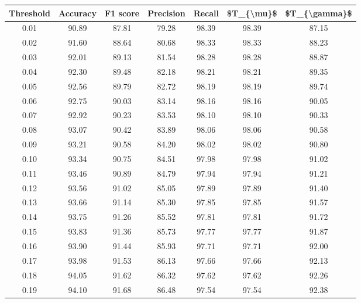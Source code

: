 \begin{tabular}{|c|c|c|c|c|c|c|}
\hline
 Threshold &  Accuracy &  F1 score &  Precision &  Recall &  \$T\_\{\textbackslash mu\}\$ &  \$T\_\{\textbackslash gamma\}\$ \\
\hline
      0.01 &     90.89 &     87.81 &      79.28 &   98.39 &      98.39 &         87.15 \\
      0.02 &     91.60 &     88.64 &      80.68 &   98.33 &      98.33 &         88.23 \\
      0.03 &     92.01 &     89.13 &      81.54 &   98.28 &      98.28 &         88.87 \\
      0.04 &     92.30 &     89.48 &      82.18 &   98.21 &      98.21 &         89.35 \\
      0.05 &     92.56 &     89.79 &      82.72 &   98.19 &      98.19 &         89.74 \\
      0.06 &     92.75 &     90.03 &      83.14 &   98.16 &      98.16 &         90.05 \\
      0.07 &     92.92 &     90.23 &      83.53 &   98.10 &      98.10 &         90.33 \\
      0.08 &     93.07 &     90.42 &      83.89 &   98.06 &      98.06 &         90.58 \\
      0.09 &     93.21 &     90.58 &      84.20 &   98.02 &      98.02 &         90.80 \\
      0.10 &     93.34 &     90.75 &      84.51 &   97.98 &      97.98 &         91.02 \\
      0.11 &     93.46 &     90.89 &      84.79 &   97.94 &      97.94 &         91.21 \\
      0.12 &     93.56 &     91.02 &      85.05 &   97.89 &      97.89 &         91.40 \\
      0.13 &     93.66 &     91.14 &      85.30 &   97.85 &      97.85 &         91.57 \\
      0.14 &     93.75 &     91.26 &      85.52 &   97.81 &      97.81 &         91.72 \\
      0.15 &     93.83 &     91.36 &      85.73 &   97.77 &      97.77 &         91.87 \\
      0.16 &     93.90 &     91.44 &      85.93 &   97.71 &      97.71 &         92.00 \\
      0.17 &     93.98 &     91.53 &      86.13 &   97.66 &      97.66 &         92.13 \\
      0.18 &     94.05 &     91.62 &      86.32 &   97.62 &      97.62 &         92.26 \\
      0.19 &     94.10 &     91.68 &      86.48 &   97.54 &      97.54 &         92.38 \\

\end{tabular}
